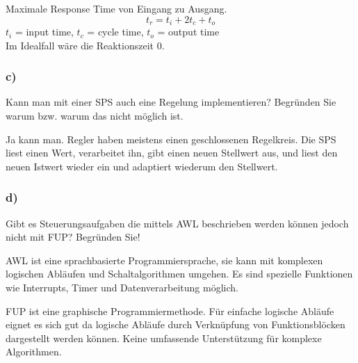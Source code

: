 Maximale Response Time von Eingang zu Ausgang.
\begin{equation}
  t_r = t_i + 2t_c + t_o
\end{equation}
$t_i$ = input time, $t_c$ = cycle time, $t_o$ = output time\\
Im Idealfall wäre die Reaktionszeit 0.


\subsubsection{c)}
Kann man mit einer SPS auch eine Regelung implementieren? Begründen Sie warum bzw. warum
das nicht möglich ist.

Ja kann man. Regler haben meistens einen geschlossenen Regelkreis. Die SPS liest einen Wert, verarbeitet ihn,
gibt einen neuen Stellwert aus, und liest den neuen Istwert wieder ein und adaptiert wiederum den Stellwert.

\subsubsection{d)}
Gibt es Steuerungsaufgaben die mittels AWL beschrieben werden können jedoch nicht mit FUP?
Begründen Sie!

AWL ist eine sprachbasierte Programmiersprache, sie kann mit komplexen logischen Abläufen und Schaltalgorithmen umgehen.
Es sind spezielle Funktionen wie Interrupts, Timer und Datenverarbeitung möglich.

FUP ist eine graphische Programmiermethode. Für einfache logische Abläufe eignet es sich gut da logische Abläufe durch 
Verknüpfung von Funktionsblöcken dargestellt werden können. Keine umfassende Unterstützung für komplexe Algorithmen.